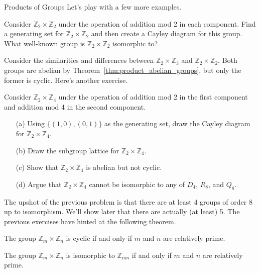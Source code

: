 \begin{section}{Products of Groups}
Let's play with a few more examples.

\begin{exercise}
Consider \(\mathbb{Z}_2\times \mathbb{Z}_2\) under the operation of addition mod 2 in each component.  Find a generating set for \(\mathbb{Z}_2\times \mathbb{Z}_2\) and then create a Cayley diagram for this group.  What well-known group is \(\mathbb{Z}_2\times \mathbb{Z}_2\) isomorphic to?
\end{exercise}

Consider the similarities and differences between \(\mathbb{Z}_2\times \mathbb{Z}_3\) and \(\mathbb{Z}_2\times \mathbb{Z}_2\).  Both groups are abelian by Theorem~\ref{thm:product_abelian_groups}, but only the former is cyclic.  Here's another exercise.

\begin{problem}
Consider \(\mathbb{Z}_2\times \mathbb{Z}_4\) under the operation of addition mod 2 in the first component and addition mod 4 in the second component. 
\begin{enumerate}
\item[(a)] Using \(\{(1,0),(0,1)\}\) as the generating set, draw the Cayley diagram for \(\mathbb{Z}_2\times \mathbb{Z}_4\).
\item[(b)] Draw the subgroup lattice for \(\mathbb{Z}_2\times \mathbb{Z}_4\).
\item[(c)] Show that \(\mathbb{Z}_2\times \mathbb{Z}_4\) is abelian but not cyclic.
\item[(d)] Argue that \(\mathbb{Z}_2\times \mathbb{Z}_4\) cannot be isomorphic to any of \(D_4\), \(R_8\), and \(Q_8\).
\end{enumerate}
\end{problem}

The upshot of the previous problem is that there are at least 4 groups of order 8 up to isomorphism.  We'll show later that there are actually (at least) 5. The previous exercises have hinted at the following theorem.

\begin{theorem}
The group \(\mathbb{Z}_m\times \mathbb{Z}_n\) is cyclic if and only if \(m\) and \(n\) are relatively prime.
\end{theorem}

\begin{corollary}
The group \(\mathbb{Z}_m\times \mathbb{Z}_n\) is isomorphic to \(\mathbb{Z}_{mn}\) if and only if \(m\) and \(n\) are relatively prime.
\end{corollary}


\end{section}

